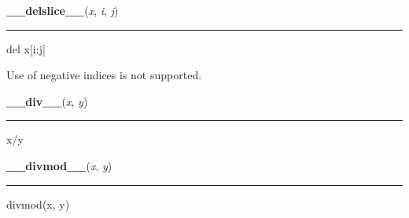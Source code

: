     \label{numpy:ndarray:__delslice__}

    \vspace{0.5ex}

    \begin{boxedminipage}{\textwidth}

    \raggedright \textbf{\_\_delslice\_\_}(\textit{x}, \textit{i}, \textit{j})

    \vspace{-1.5ex}

    \rule{\textwidth}{0.5\fboxrule}

del x{[}i:j{]}

Use of negative indices is not supported.
    \vspace{1ex}

    \end{boxedminipage}

    \label{numpy:ndarray:__div__}

    \vspace{0.5ex}

    \begin{boxedminipage}{\textwidth}

    \raggedright \textbf{\_\_div\_\_}(\textit{x}, \textit{y})

    \vspace{-1.5ex}

    \rule{\textwidth}{0.5\fboxrule}

x/y
    \vspace{1ex}

    \end{boxedminipage}

    \label{numpy:ndarray:__divmod__}

    \vspace{0.5ex}

    \begin{boxedminipage}{\textwidth}

    \raggedright \textbf{\_\_divmod\_\_}(\textit{x}, \textit{y})

    \vspace{-1.5ex}

    \rule{\textwidth}{0.5\fboxrule}

divmod(x, y)
    \vspace{1ex}

    \end{boxedminipage}

